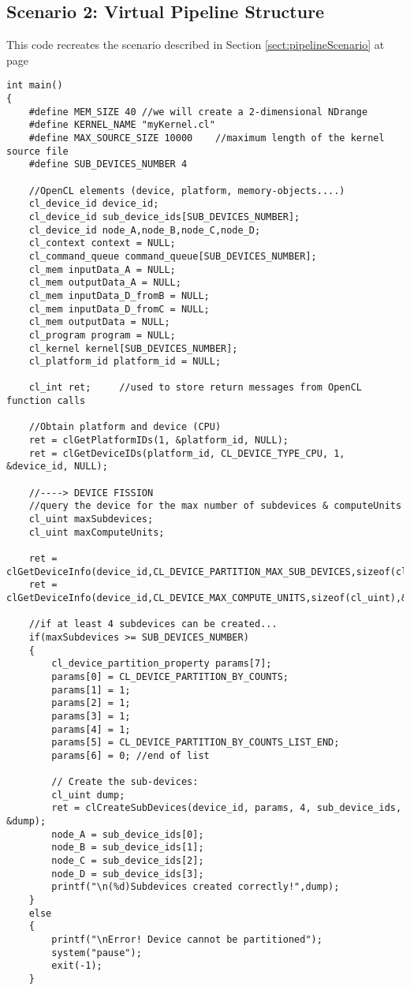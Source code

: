\subsection{Scenario 2: Virtual Pipeline Structure}

This code recreates the scenario described in Section \ref{sect:pipelineScenario} at page \pageref{sect:pipelineScenario}

{\scriptsize\begin{verbatim}
int main()
{
	#define MEM_SIZE 40 //we will create a 2-dimensional NDrange
	#define KERNEL_NAME "myKernel.cl"
	#define MAX_SOURCE_SIZE 10000    //maximum length of the kernel source file
	#define SUB_DEVICES_NUMBER 4

	//OpenCL elements (device, platform, memory-objects....)
	cl_device_id device_id;
	cl_device_id sub_device_ids[SUB_DEVICES_NUMBER];
	cl_device_id node_A,node_B,node_C,node_D;
	cl_context context = NULL;
	cl_command_queue command_queue[SUB_DEVICES_NUMBER];
	cl_mem inputData_A = NULL;
	cl_mem outputData_A = NULL;
	cl_mem inputData_D_fromB = NULL;
	cl_mem inputData_D_fromC = NULL;
	cl_mem outputData = NULL;
	cl_program program = NULL;
	cl_kernel kernel[SUB_DEVICES_NUMBER];
	cl_platform_id platform_id = NULL;
	
	cl_int ret;     //used to store return messages from OpenCL function calls
	
	//Obtain platform and device (CPU)
	ret = clGetPlatformIDs(1, &platform_id, NULL);
	ret = clGetDeviceIDs(platform_id, CL_DEVICE_TYPE_CPU, 1, &device_id, NULL);

	//----> DEVICE FISSION
	//query the device for the max number of subdevices & computeUnits
	cl_uint maxSubdevices;
	cl_uint maxComputeUnits;
	
	ret = clGetDeviceInfo(device_id,CL_DEVICE_PARTITION_MAX_SUB_DEVICES,sizeof(cl_uint),&maxSubdevices,NULL);
	ret = clGetDeviceInfo(device_id,CL_DEVICE_MAX_COMPUTE_UNITS,sizeof(cl_uint),&maxComputeUnits,NULL);
	
	//if at least 4 subdevices can be created...
	if(maxSubdevices >= SUB_DEVICES_NUMBER)
	{
		cl_device_partition_property params[7];
		params[0] = CL_DEVICE_PARTITION_BY_COUNTS;
		params[1] = 1;
		params[2] = 1;
		params[3] = 1;
		params[4] = 1;
		params[5] = CL_DEVICE_PARTITION_BY_COUNTS_LIST_END;
		params[6] = 0; //end of list
				
		// Create the sub-devices:
		cl_uint dump;
		ret = clCreateSubDevices(device_id, params, 4, sub_device_ids, &dump);
		node_A = sub_device_ids[0];
		node_B = sub_device_ids[1];
		node_C = sub_device_ids[2];
		node_D = sub_device_ids[3];
		printf("\n(%d)Subdevices created correctly!",dump);
	}
	else
	{
		printf("\nError! Device cannot be partitioned");
		system("pause");
		exit(-1);
	}
	

\end{verbatim}}
